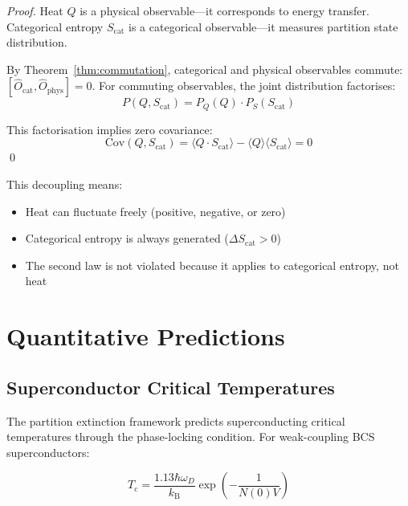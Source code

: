 \documentclass[twocolumn,10pt,aps,prd,superscriptaddress,nofootinbib]{revtex4-2}
\theoremstyle{remark}
\newcommand{\kB}{k_{\mathrm{B}}}
\newcommand{\Tcrit}{T_{\mathrm{c}}}
\newcommand{\Scat}{S_{\mathrm{cat}}}
\newcommand{\Ocat}{\hat{O}_{\mathrm{cat}}}
\newcommand{\Ophys}{\hat{O}_{\mathrm{phys}}}
\begin{document}
\begin{proof}
Heat $Q$ is a physical observable---it corresponds to energy transfer. Categorical entropy $\Scat$ is a categorical observable---it measures partition state distribution.

By Theorem~\ref{thm:commutation}, categorical and physical observables commute: $[\Ocat, \Ophys] = 0$. For commuting observables, the joint distribution factorises:
\begin{equation}
P(Q, \Scat) = P_Q(Q) \cdot P_S(\Scat)
\end{equation}

This factorisation implies zero covariance:
\begin{equation}
\text{Cov}(Q, \Scat) = \langle Q \cdot \Scat \rangle - \langle Q \rangle \langle \Scat \rangle = 0
\end{equation}
\qed
\end{proof}

This decoupling means:
\begin{itemize}
\item Heat can fluctuate freely (positive, negative, or zero)
\item Categorical entropy is always generated ($\Delta \Scat > 0$)
\item The second law is not violated because it applies to categorical entropy, not heat
\end{itemize}


\section{Quantitative Predictions}
\label{sec:predictions}

\subsection{Superconductor Critical Temperatures}

The partition extinction framework predicts superconducting critical temperatures through the phase-locking condition. For weak-coupling BCS superconductors:

\begin{equation}
\Tcrit = \frac{1.13 \hbar \omega_D}{\kB} \exp\left(-\frac{1}{N(0)V}\right)
\label{eq:Tc_prediction}
\end{equation}
\end{document}
